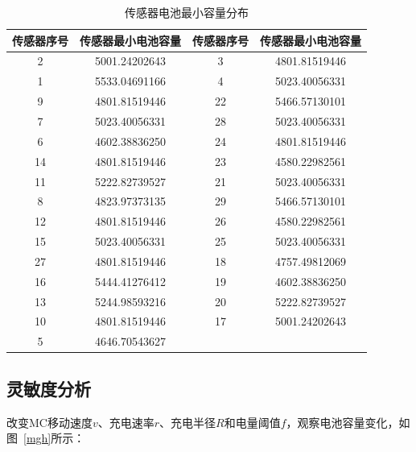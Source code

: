 \documentclass{whutmod}
\begin{document}
            \begin{table}[H]
                \centering
                \caption{传感器电池最小容量分布}\label{biao2}
                \begin{tabular}{cccc}
                    \toprule[2pt]
                    \multicolumn{1}{m{2.5cm}}{\centering 传感器序号} &
                    \multicolumn{1}{m{4.5cm}}{\centering 传感器最小电池容量} &
                    \multicolumn{1}{m{2.5cm}}{\centering 传感器序号} &
                    \multicolumn{1}{m{4.5cm}}{\centering 传感器最小电池容量} \\
                    \midrule[1pt]
                    2 & 5001.24202643 & 3 & 4801.81519446 \\
                    1 & 5533.04691166 & 4 & 5023.40056331 \\
                    9 & 4801.81519446 & 22 & 5466.57130101 \\
                    7 & 5023.40056331 & 28 & 5023.40056331 \\
                    6 & 4602.38836250 & 24 & 4801.81519446 \\
                    14 & 4801.81519446 & 23 & 4580.22982561 \\
                    11 & 5222.82739527 & 21 & 5023.40056331 \\
                    8 & 4823.97373135 & 29 & 5466.57130101 \\
                    12 & 4801.81519446 & 26 & 4580.22982561 \\
                    15 & 5023.40056331 & 25 & 5023.40056331 \\
                    27 & 4801.81519446 & 18 & 4757.49812069 \\
                    16 & 5444.41276412 & 19 & 4602.38836250 \\
                    13 & 5244.98593216 & 20 & 5222.82739527 \\
                    10 & 4801.81519446 & 17 & 5001.24202643 \\
                    5 & 4646.70543627 & & \\
                    \bottomrule[2pt]
                \end{tabular}
            \end{table}

        \subsection{灵敏度分析}
            改变MC移动速度$v$、充电速率$r$、充电半径$R$和电量阈值$f$，观察电池容量变化，如图~\ref{mgh}所示：
\end{document}
